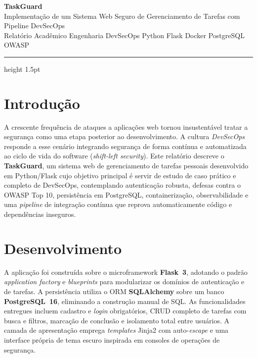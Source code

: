 \documentclass[11pt,a4paper]{article}
\begin{document}
\begin{center}
  {\fontsize{27}{31}\selectfont\bfseries\color{tgGreenD}TaskGuard}\\[3pt]
  {\large Implementação de um Sistema Web Seguro de Gerenciamento de Tarefas com Pipeline DevSecOps}\\[5pt]
  {\small\color{tgGray}Relatório Acadêmico \textbullet{} Engenharia DevSecOps \textbullet{} Python \textbullet{} Flask \textbullet{} Docker \textbullet{} PostgreSQL \textbullet{} OWASP}
\end{center}
\vspace{1pt}
{\color{tgGreen}\hrule height 1.5pt}
\vspace{8pt}

\section{Introdução}
A crescente frequência de ataques a aplicações web tornou insustentável tratar a segurança como uma etapa posterior ao desenvolvimento. A cultura \emph{DevSecOps} responde a esse cenário integrando segurança de forma contínua e automatizada ao ciclo de vida do software (\emph{shift-left security}). Este relatório descreve o \textbf{TaskGuard}, um sistema web de gerenciamento de tarefas pessoais desenvolvido em Python/Flask cujo objetivo principal é servir de estudo de caso prático e completo de DevSecOps, contemplando autenticação robusta, defesas contra o OWASP Top 10, persistência em PostgreSQL, containerização, observabilidade e uma \emph{pipeline} de integração contínua que reprova automaticamente código e dependências inseguros.

\section{Desenvolvimento}
A aplicação foi construída sobre o microframework \textbf{Flask~3}, adotando o padrão \emph{application factory} e \emph{blueprints} para modularizar os domínios de autenticação e de tarefas. A persistência utiliza o ORM \textbf{SQLAlchemy} sobre um banco \textbf{PostgreSQL~16}, eliminando a construção manual de SQL. As funcionalidades entregues incluem cadastro e \emph{login} obrigatórios, CRUD completo de tarefas com busca e filtros, marcação de conclusão e isolamento total entre usuários. A camada de apresentação emprega \emph{templates} Jinja2 com auto-\emph{escape} e uma interface própria de tema escuro inspirada em consoles de operações de segurança.
\end{document}
